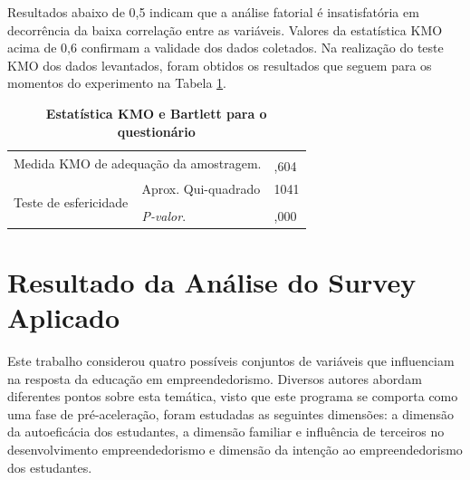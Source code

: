 Resultados abaixo de 0,5 indicam que a análise fatorial é insatisfatória em decorrência da baixa correlação entre as variáveis. Valores da estatística KMO acima de 0,6 confirmam a validade dos dados coletados. Na realização do teste KMO dos dados levantados, foram obtidos os resultados que seguem para os momentos do experimento na Tabela \ref{tabela_8}.

\begin{table}[H]
\FloatBarrier
\centering
\caption{\textbf{Estatística KMO e Bartlett para o questionário}}
\label{tabela_8}
\begin{tabular}{ll|l}
\hline\hline
\multicolumn{2}{l|}{\multirow{2}{*}{Medida KMO de adequação da amostragem.}} &  \\
\multicolumn{2}{l|}{} & ,604 \\ \hline
\multirow{3}{*}{Teste de esfericidade} & Aprox. Qui-quadrado & 1041 \\
 & \\
 & \textit{P-valor}. & ,000 \\ \hline
\end{tabular}
\end{table}

\section{Resultado da Análise do Survey Aplicado}

Este trabalho considerou quatro possíveis conjuntos de variáveis que influenciam na resposta da educação em empreendedorismo. Diversos autores abordam diferentes pontos sobre esta temática, visto que este programa se comporta como uma fase de pré-aceleração, foram estudadas as seguintes dimensões: a dimensão da autoeficácia dos estudantes,  a dimensão familiar e influência de terceiros no desenvolvimento empreendedorismo e dimensão da intenção  ao empreendedorismo dos estudantes.






